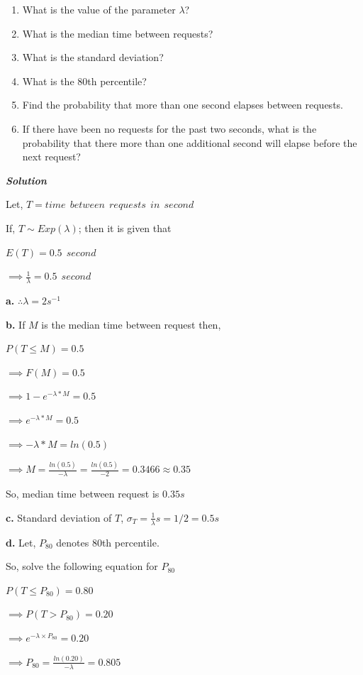 \documentclass[
  11pt,
  letterpaper,
  DIV=11,
  numbers=noendperiod]{scrreprt}
\providecommand{\tightlist}{%
  \setlength{\itemsep}{0pt}\setlength{\parskip}{0pt}}
\begin{document}
\begin{enumerate}
\def\labelenumi{\alph{enumi}.}
\tightlist
\item
  What is the value of the parameter \(\lambda\)?
\item
  What is the median time between requests?
\item
  What is the standard deviation?
\item
  What is the 80th percentile?
\item
  Find the probability that more than one second elapses between
  requests.
\item
  If there have been no requests for the past two seconds, what is the
  probability that there more than one additional second will elapse
  before the next request?
\end{enumerate}

\textbf{\emph{Solution}}

Let, \(T=time \ \ between \ \ requests \ \ in \ \ second\)

If, \(T\sim Exp(\lambda)\); then it is given that

\(E(T)=0.5 \ \ second\)

\(\implies \frac{1}{\lambda}=0.5 \ \ second\)

\textbf{a.} \(\therefore \lambda=2 s^{-1}\)

\textbf{b.} If \(M\) is the median time between request then,

\(P(T \le M)=0.5\)

\(\implies F(M)=0.5\)

\(\implies 1-e^{-\lambda *M}=0.5\)

\(\implies e^{-\lambda *M}=0.5\)

\(\implies {-\lambda *M}=ln(0.5)\)

\(\implies M =\frac{ln(0.5)}{-\lambda}=\frac{ln(0.5)}{-2}=0.3466\approx0.35\)

So, median time between request is \(0.35s\)

\textbf{c.} Standard deviation of \(T\),
\(\sigma_T=\frac{1}{\lambda}s=1/2 =0.5 s\)

\textbf{d.} Let, \(P_{80}\) denotes 80th percentile.

So, solve the following equation for \(P_{80}\)

\(P(T\le P_{80})=0.80\)

\(\implies P(T>P_{80})=0.20\)

\(\implies e^{-\lambda \times P_{80}}=0.20\)

\(\implies P_{80}=\frac {ln(0.20)}{-\lambda}=0.805\)
\end{document}
